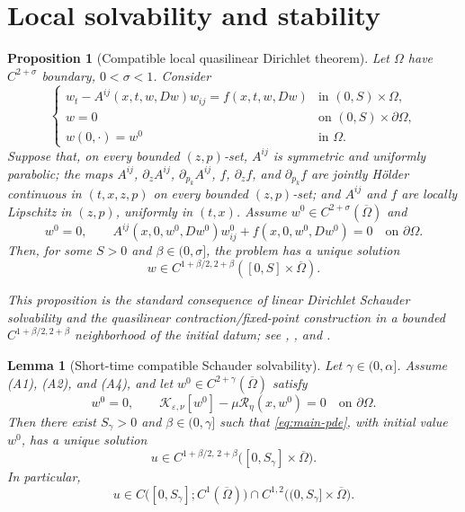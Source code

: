 \documentclass[11pt]{article}
\newtheorem{proposition}[theorem]{Proposition}
\newtheorem{lemma}[theorem]{Lemma}
\theoremstyle{remark}
\newcommand{\cT}{\mathcal{R}}
\begin{document}
\section{Local solvability and stability}
\label{sec:local}

\begin{proposition}[Compatible local quasilinear Dirichlet theorem]
\label{prop:external-local}
Let $\Omega$ have $C^{2+\sigma}$ boundary, $0<\sigma<1$.  Consider
\[
 \begin{cases}
 w_t-A^{ij}(x,t,w,Dw)w_{ij}=f(x,t,w,Dw)
     &\text{in }(0,S)\times\Omega,\\
 w=0&\text{on }(0,S)\times\partial\Omega,\\
 w(0,\cdot)=w^0&\text{in }\Omega.
 \end{cases}
\]
Suppose that, on every bounded $(z,p)$-set, $A^{ij}$ is symmetric and
uniformly parabolic; the maps $A^{ij}$, $\partial_zA^{ij}$, $\partial_{p_k}A^{ij}$, $f$,
$\partial_zf$, and $\partial_{p_k}f$ are jointly H\"older continuous in
$(t,x,z,p)$ on every bounded $(z,p)$-set; and $A^{ij}$ and $f$ are
locally Lipschitz in $(z,p)$, uniformly in $(t,x)$.  Assume
$w^0\in C^{2+\sigma}(\overline\Omega)$ and
\[
 w^0=0,\qquad
 A^{ij}(x,0,w^0,Dw^0)w^0_{ij}+f(x,0,w^0,Dw^0)=0
 \quad\text{on }\partial\Omega.
\]
Then, for some $S>0$ and $\beta\in(0,\sigma]$, the problem has a unique
solution
\[
 w\in C^{1+\beta/2,2+\beta}([0,S]\times\overline\Omega).
\]

\vspace{.1in}
This proposition is the standard consequence of linear Dirichlet Schauder
solvability and the quasilinear contraction/fixed-point construction in a
bounded $C^{1+\beta/2,2+\beta}$ neighborhood of the initial datum; see
\cite[Chapter~V, Sections~6--7]{LSU1968},
\cite[Chapter~6]{Friedman1964}, and
\cite[Chapters~XIII--XIV]{Lieberman1996}.
\end{proposition}

\begin{lemma}[Short-time compatible Schauder solvability]
\label{lem:local}
Let $\gamma\in(0,\alpha]$. Assume {\rm (A1)}, {\rm (A2)}, and {\rm (A4)}, and let
$w^0\in C^{2+\gamma}(\overline{\Omega})$ satisfy
\[
w^0=0,
\qquad
\mathcal{K}_{\varepsilon,\nu}[w^0]
-\mu\cT_\eta(x,w^0)=0
\quad\text{on }\partial\Omega.
\]
Then there exist $S_\gamma>0$ and $\beta\in(0,\gamma]$ such that
\eqref{eq:main-pde}, with initial value $w^0$, has a unique solution
\[
u\in
C^{1+\beta/2,\,2+\beta}
\bigl([0,S_\gamma]\times\overline{\Omega}\bigr).
\]
In particular,
\[
u\in
C\bigl([0,S_\gamma];C^1(\overline{\Omega})\bigr)
\cap
C^{1,2}\bigl((0,S_\gamma]\times\overline{\Omega}\bigr).
\]
\end{lemma}
\end{document}
